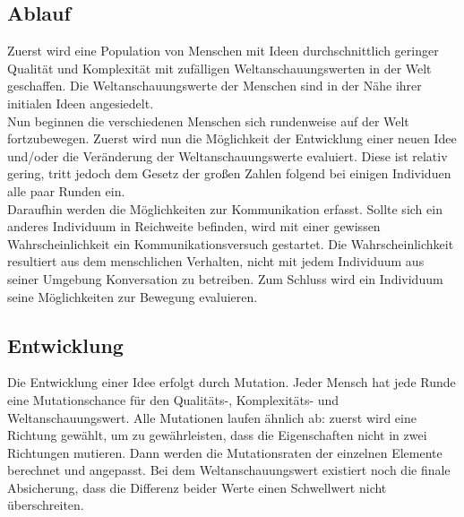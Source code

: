 \subsection{Ablauf}
Zuerst wird eine Population von Menschen mit Ideen durchschnittlich geringer Qualität und Komplexität mit zufälligen Weltanschauungswerten in der Welt geschaffen. 
Die Weltanschauungswerte der Menschen sind in der Nähe ihrer initialen Ideen angesiedelt. \\
Nun beginnen die verschiedenen Menschen sich rundenweise auf der Welt fortzubewegen. 
Zuerst wird nun die Möglichkeit der Entwicklung einer neuen Idee und/oder die Veränderung der Weltanschauungswerte evaluiert. Diese ist relativ gering, tritt jedoch dem Gesetz der großen Zahlen folgend bei einigen Individuen alle paar Runden ein. \\
Daraufhin werden die Möglichkeiten zur Kommunikation erfasst. Sollte sich ein anderes Individuum in Reichweite befinden, wird mit einer gewissen Wahrscheinlichkeit ein Kommunikationsversuch gestartet. 
Die Wahrscheinlichkeit resultiert aus dem menschlichen Verhalten, nicht mit jedem Individuum aus seiner Umgebung Konversation zu betreiben.
Zum Schluss wird ein Individuum seine Möglichkeiten zur Bewegung evaluieren.

\subsection{Entwicklung}
Die Entwicklung einer Idee erfolgt durch Mutation.
Jeder Mensch hat jede Runde eine Mutationschance für den Qualitäts-, Komplexitäts- und Weltanschauungswert.
Alle Mutationen laufen ähnlich ab: zuerst wird eine Richtung gewählt, um zu gewährleisten, dass die Eigenschaften nicht in zwei Richtungen mutieren. 
Dann werden die Mutationsraten der einzelnen Elemente berechnet und angepasst.
Bei dem Weltanschauungswert existiert noch die finale Absicherung, dass die Differenz beider Werte einen Schwellwert nicht überschreiten.
\newpage
